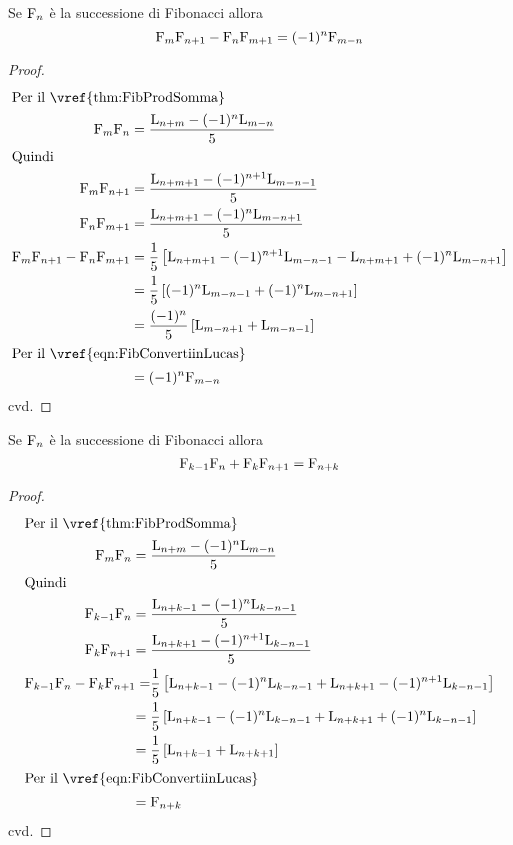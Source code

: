\begin{thm}\label{thm:FibdOcagne}
	Se $\mathrm{F}_{n}$ è la successione di Fibonacci allora 
	\begin{equation}
		\mathrm{F}_{m}\mathrm{F}_{n+1}-\mathrm{F}_{n}\mathrm{F}_{m+1}=(-1)^n\mathrm{F}_{m-n}
	\end{equation}\label{eqn:FibdOcagne}
\end{thm}
\begin{proof}
\begin{align*}
	\intertext{Per il~\vref{thm:FibProdSomma}}
	\Fib{m}\Fib{n}={}&\dfrac{\Luc{n+m}-(-1)^n\Luc{m-n}}{5}\\
	\intertext{Quindi}
		\Fib{m}\Fib{n+1}={}&\dfrac{\Luc{n+m+1}-(-1)^{n+1}\Luc{m-n-1}}{5}\\
		\Fib{n}\Fib{m+1}={}&\dfrac{\Luc{n+m+1}-(-1)^{n}\Luc{m-n+1}}{5}\\
		\Fib{m}\Fib{n+1}-\Fib{n}\Fib{m+1}
	={}&{}\dfrac{1}{5}\left[\Luc{n+m+1}-(-1)^{n+1}\Luc{m-n-1}-\Luc{n+m+1}+(-1)^{n}\Luc{m-n+1}\right]\\
={}&\dfrac{1}{5}\left[(-1)^{n}\Luc{m-n-1}+(-1)^{n}\Luc{m-n+1}\right]\\
={}&\dfrac{(-1)^{n}}{5}\left[\Luc{m-n+1}+\Luc{m-n-1}\right]\\
\intertext{Per il~\vref{eqn:FibConvertiinLucas}}
={}&(-1)^{n}\Fib{m-n}\\
\end{align*}
cvd.
\end{proof}
\begin{thm}\label{thm:FibHonsberger}
	Se $\mathrm{F}_{n}$ è la successione di Fibonacci allora 
	\begin{equation}
		\mathrm{F}_{k-1}\mathrm{F}_{n}+\mathrm{F}_{k}\mathrm{F}_{n+1}=\mathrm{F}_{n+k}
	\end{equation}\label{eqn:FibHonsberger}
\end{thm}
\begin{proof}
	\begin{align*}
		\intertext{Per il~\vref{thm:FibProdSomma}}
	\Fib{m}\Fib{n}={}&\dfrac{\Luc{n+m}-(-1)^n\Luc{m-n}}{5}\\
	\intertext{Quindi}
	\Fib{k-1}\Fib{n}={}&\dfrac{\Luc{n+k-1}-(-1)^n\Luc{k-n-1}}{5}\\
	\Fib{k}\Fib{n+1}={}&\dfrac{\Luc{n+k+1}-(-1)^{n+1}\Luc{k-n-1}}{5}\\
	\Fib{k-1}\Fib{n}-\Fib{k}\Fib{n+1}=
	&\dfrac{1}{5}\left[\Luc{n+k-1}-(-1)^n\Luc{k-n-1}+\Luc{n+k+1}-(-1)^{n+1}\Luc{k-n-1}\right]\\
={}&{}\dfrac{1}{5}\left[\Luc{n+k-1}-(-1)^n\Luc{k-n-1}+\Luc{n+k+1}+(-1)^{n}\Luc{k-n-1}\right]\\
={}&{}\dfrac{1}{5}\left[\Luc{n+k-1}+\Luc{n+k+1}\right]\\
	\intertext{Per il~\vref{eqn:FibConvertiinLucas}}
={}&{}\Fib{n+k}
	\end{align*}
cvd.
\end{proof}
